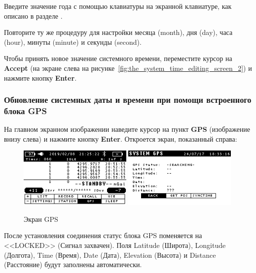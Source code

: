 Введите значение года с помощью клавиатуры на экранной клавиатуре, как
описано в разделе .

Повторите ту же процедуру для настройки месяца (month), дня (day), часа (hour),
минуты (minute) и секунды (second).

Чтобы принять новое значение системного времени, переместите курсор на
\textbf{Accept}
(на экране слева на рисунке~\ref{fig:the_system_time_editing_screen_2}) и
нажмите кнопку \textbf{Enter}.

\subsubsection{Обновление системных даты и времени при помощи встроенного блока
  GPS}

На главном экранном изображении наведите курсор на пункт \textbf{GPS} (изображение
внизу слева) и нажмите кнопку \textbf{Enter}. Откроется экран, показанный справа:

\begin{figure}[H]
  \centering
  \includegraphics[width=0.49\textwidth]{figures/the_gps_screen_1}
  \includegraphics[width=0.49\textwidth]{figures/the_gps_screen_2}
  \caption{Экран GPS}
  \label{fig:the_gps_screen_1}
\end{figure}


После установления соединения статус блока GPS поменяется на <<LOCKED>> (Сигнал
захвачен). Поля Latitude (Широта), Longitude (Долгота), Time (Время), Date
(Дата), Elevation (Высота) и Distance (Расстояние) будут заполнены
автоматически.

